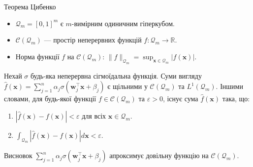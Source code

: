 \documentclass{zkdl-presentation-template}
\begin{document}
    \begin{frame}{Теорема Цибенко}
        \begin{itemize}
            \item $\mathcal{Q}_m = [0,1]^m$ є $m$-вимірним одиничним гіперкубом.
            \item $\mathcal{C}(\mathcal{Q}_m)$ --- простір неперервних функцій $f: \mathcal{Q}_m \to \mathbb{R}$.
            \item Норма функції $f$ на $\mathcal{C}(\mathcal{Q}_m)$: $\|f\|_{\mathcal{Q}_m} = \sup_{\boldsymbol{x} \in \mathcal{Q}_m} |f(\boldsymbol{x})|$.
        \end{itemize}

        \begin{theorem}[Цибенко]
            Нехай $\sigma$ будь-яка неперервна сігмоїдальна функція. Суми вигляду
            $\hat{f}(\boldsymbol{x}) = \sum_{j=1}^n
            \alpha_j\sigma(\boldsymbol{w}_j^{\top}\boldsymbol{x} + \beta_j)$ є щільними у
            $\mathcal{C}(\mathcal{Q}_m)$ та $L^1(\mathcal{Q}_m)$. Іншими словами, для
            будь-якої функції $f \in \mathcal{C}(\mathcal{Q}_m)$ та $\varepsilon > 0$,
            існує сума $\hat{f}(\boldsymbol{x})$ така, що:
            \begin{enumerate}
                \item $|\hat{f}(\boldsymbol{x})-f(\boldsymbol{x})|<\varepsilon$ для всіх $\boldsymbol{x} \in
                \mathcal{Q}_m$.
                \item $\int_{\mathcal{Q}_m}|\hat{f}(\boldsymbol{x})-f(\boldsymbol{x})|d\boldsymbol{x} <
                \varepsilon$.
            \end{enumerate}
        \end{theorem}

        \pause\begin{alertblock}{Висновок}
            $\sum_{j=1}^n
            \alpha_j\sigma(\boldsymbol{w}_j^{\top}\boldsymbol{x} + \beta_j)$ апроксимує 
            довільну функцію на $\mathcal{C}(\mathcal{Q}_m)$.
        \end{alertblock}
    \end{frame}
\end{document}
